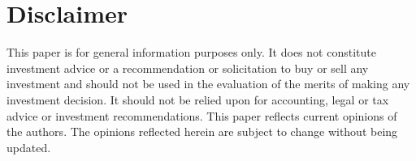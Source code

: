 \documentclass[sigconf,nonacm,prologue,table]{acmart}
\begin{document}
% 
% 


\section*{Disclaimer}

This paper is for general information purposes only. It does not constitute investment advice or a recommendation or solicitation to buy or sell any investment and should not be used in the evaluation of the merits of making any investment decision. It should not be relied upon for accounting, legal or tax advice or investment recommendations.  This paper reflects current opinions of the authors. The opinions reflected herein are subject to change without being updated. 
\end{document}
